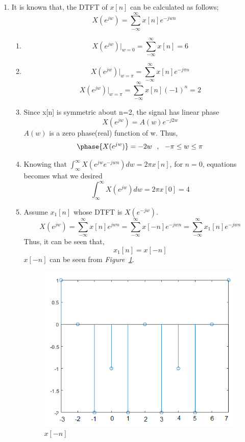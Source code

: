 \documentclass[a4paper,12pt]{article}
\begin{document}
\begin{enumerate}
	\item It is known that, the DTFT of $x[n]$ can be calculated as follows;
		$$	X(e^{jw})=\sum_{-\infty}^{\infty}x[n]e^{-jwn}	$$
		\begin{enumerate}
			\item 
				$$\boxed{	X(e^{jw})|_{w=0}=\sum_{-\infty}^{\infty}x[n]=6	}$$
			\item
				$$	X(e^{jw})|_{w=\pi}=\sum_{-\infty}^{\infty}x[n]e^{-j\pi n}$$
				$$\boxed{	X(e^{jw})|_{w=\pi}=\sum_{-\infty}^{\infty}x[n]{(-1)}^{ n}=2	}$$
			\item Since x[n] is symmetric about n=2, the signal has linear phase
			$$	X(e^{jw})=A(w)e^{-j2w}	$$
			$A(w)$ is a zero phase(real) function of w. Thus,
			$$	\phase{X(e^{jw})}=-2w~~,~~-\pi \leq w\leq \pi	$$
			\item Knowing that $	\int_{\infty}^{\infty}X(e^{jw}e^{-jwn})dw=2\pi x[n]	$, for $n=0$, equations becomes what we desired
			$$\boxed{	\int_{\infty}^{\infty}X(e^{jw})dw= 2\pi x[0]=4}$$
			\item Assume $x_1[n]$ whose DTFT is $X(e^{-jw})$.
			$$ X(e^{jw})=\sum_{-\infty}^{\infty} x[n]e^{jwn}=\sum_{-\infty}^{\infty} x[-n]e^{-jwn}=\sum_{-\infty}^{\infty} x_1[n]e^{-jwn} $$
			Thus, it can be seen that,	
			$$\boxed{	x_1[n]=x[-n]	}$$
			$x[-n]$ can be seen from \textit{Figure~\ref{fig:q10a}}.
				\begin{figure}[H]
					\centering
					\setlength{\unitlength}{\textwidth} 
					\includegraphics[width=0.6\unitlength]{q10a}
					\caption{\label{fig:q10a} $x[-n]$  }
				\end{figure}

\end{enumerate}
\end{enumerate}
\end{document}
